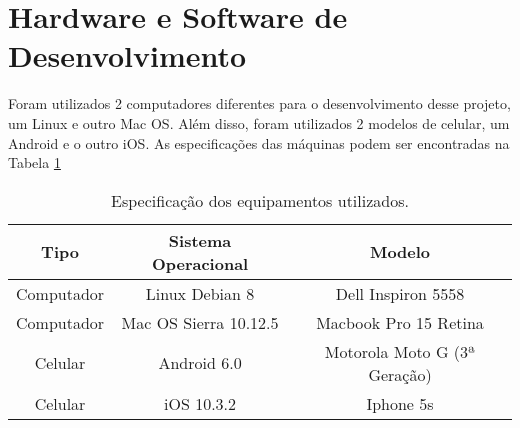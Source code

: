 \section{Hardware e Software de Desenvolvimento}

Foram utilizados 2 computadores diferentes para o desenvolvimento desse projeto, um Linux e outro Mac OS. Além disso, foram utilizados 2 modelos de celular, um Android e o outro iOS. As especificações das máquinas podem ser encontradas na Tabela \ref{tab-hardware}

\begin{table}[h]
    \centering
    \caption{Especificação dos equipamentos utilizados.}
    \label{tab-hardware}
    \begin{tabular}{|c|c|c|}\hline
        \textbf{Tipo} & \textbf{Sistema Operacional} & \textbf{Modelo}              \\ \hline
        Computador    & Linux Debian 8               & Dell Inspiron 5558           \\ \hline
        Computador    & Mac OS Sierra 10.12.5         & Macbook Pro 15 Retina        \\ \hline
        Celular       & Android 6.0                  & Motorola Moto G (3ª Geração) \\ \hline
        Celular       & iOS 10.3.2                   & Iphone 5s                    \\ \hline
    \end{tabular}
\end{table}
